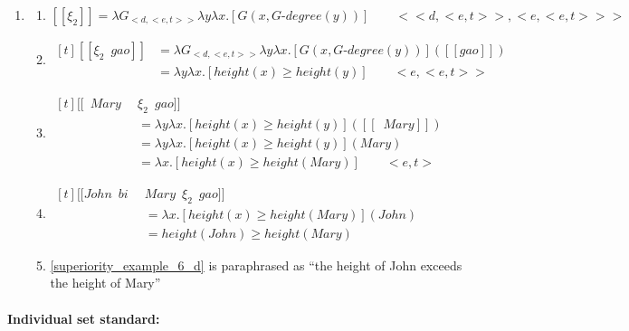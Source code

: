 \documentclass{ctexart}
\begin{document}
\begin{enumerate}
    \item \label{superiority_example_6}
    \begin{enumerate}
        \item \label{superiority_example_6_a}
        $[\![\xi_2]\!] = \lambda G_{<d,<e,t>>} \lambda y \lambda x.[G(x,G \mbox{-} degree(y))] \qquad <<d,<e,t>>,<e,<e,t>>>$

        \item \label{superiority_example_6_b}
        $\begin{aligned}[t]
            [\![\xi_2 \enspace gao]\!] 
            &= \lambda G_{<d,<e,t>>} \lambda y \lambda x.[G(x,G\mbox{-}degree(y))]([\![gao]\!]) \\
            &= \lambda y \lambda x.[height(x) \geq height(y)] \qquad <e,<e,t>>
        \end{aligned}$

        \item \label{superiority_example_6_c}
        $\begin{aligned}[t]
            [\![\enspace Mary \enspace & \xi_2 \enspace gao]\!] \\
            &= \lambda y \lambda x.[height(x) \geq height(y)]([\![\enspace Mary]\!]) \\
            &= \lambda y \lambda x.[height(x) \geq height(y)](Mary) \\
            &= \lambda x.[height(x) \geq height(Mary)] \qquad <e,t>
        \end{aligned}$

        \item \label{superiority_example_6_d}
        $\begin{aligned}[t]
            [\![John \enspace bi \enspace & Mary \enspace \xi_2 \enspace gao]\!] \\
            &= \lambda x.[height(x) \geq height(Mary)](John) \\
            &= height(John) \geq height(Mary)
        \end{aligned}$

        \item \label{superiority_example_6_e}
        \ref{superiority_example_6_d} is paraphrased as ``the height of John exceeds the height of Mary''

    \end{enumerate}
\end{enumerate}

\paragraph{Individual set standard:}
\end{document}
